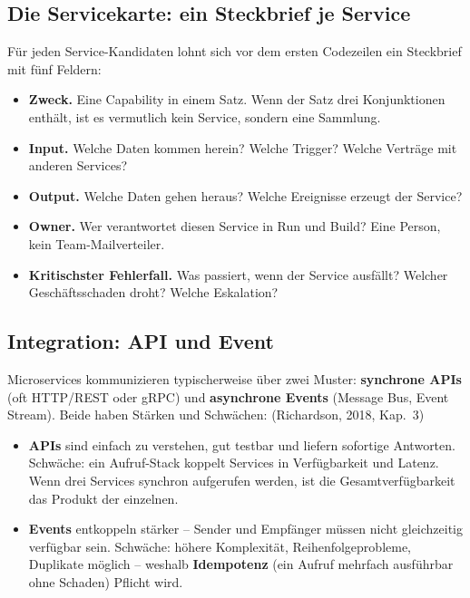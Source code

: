\documentclass[11pt,a4paper,oneside]{article}
\newcommand{\fachbegriff}[1]{\textbf{#1}}
\newcommand{\quelle}[1]{{\footnotesize\color{lpGray}(#1)}}
\begin{document}
\subsection{Die Servicekarte: ein Steckbrief je Service}

Für jeden Service-Kandidaten lohnt sich vor dem ersten Codezeilen ein Steckbrief mit fünf Feldern:

\begin{itemize}
  \item \textbf{Zweck.} Eine Capability in einem Satz. Wenn der Satz drei Konjunktionen enthält, ist es vermutlich kein Service, sondern eine Sammlung.
  \item \textbf{Input.} Welche Daten kommen herein? Welche Trigger? Welche Verträge mit anderen Services?
  \item \textbf{Output.} Welche Daten gehen heraus? Welche Ereignisse erzeugt der Service?
  \item \textbf{Owner.} Wer verantwortet diesen Service in Run und Build? Eine Person, kein Team-Mailverteiler.
  \item \textbf{Kritischster Fehlerfall.} Was passiert, wenn der Service ausfällt? Welcher Geschäftsschaden droht? Welche Eskalation?
\end{itemize}

\subsection{Integration: API und Event}

Microservices kommunizieren typischerweise über zwei Muster: \fachbegriff{synchrone APIs} (oft HTTP/REST oder gRPC) und \fachbegriff{asynchrone Events} (Message Bus, Event Stream). Beide haben Stärken und Schwächen: \quelle{Richardson, 2018, Kap.~3}

\begin{itemize}
  \item \textbf{APIs} sind einfach zu verstehen, gut testbar und liefern sofortige Antworten. Schwäche: ein Aufruf-Stack koppelt Services in Verfügbarkeit und Latenz. Wenn drei Services synchron aufgerufen werden, ist die Gesamtverfügbarkeit das Produkt der einzelnen.
  \item \textbf{Events} entkoppeln stärker -- Sender und Empfänger müssen nicht gleichzeitig verfügbar sein. Schwäche: höhere Komplexität, Reihenfolgeprobleme, Duplikate möglich -- weshalb \fachbegriff{Idempotenz} (ein Aufruf mehrfach ausführbar ohne Schaden) Pflicht wird.
\end{itemize}
\end{document}
